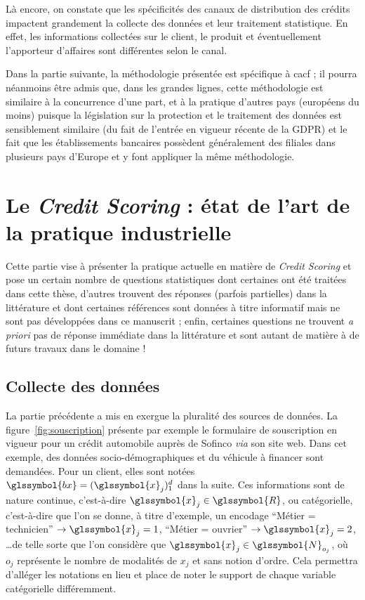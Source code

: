 Là encore, on constate que les spécificités des canaux de distribution des crédits impactent grandement la collecte des données et leur traitement statistique. En effet, les informations collectées sur le client, le produit et éventuellement l'apporteur d'affaires sont différentes selon le canal.

Dans la partie suivante, la méthodologie présentée est spécifique à \gls{cacf} ; il pourra néanmoins être admis que, dans les grandes lignes, cette méthodologie est similaire à la concurrence d'une part, et à la pratique d'autres pays (européens du moins) puisque la législation sur la protection et le traitement des données est sensiblement similaire (du fait de l'entrée en vigueur récente de la GDPR) et le fait que les établissements bancaires possèdent généralement des filiales dans plusieurs pays d'Europe et y font appliquer la même méthodologie.


\section{Le \textit{Credit Scoring} : état de l'art de la pratique industrielle} \label{chap1:sec2}

Cette partie vise à présenter la pratique actuelle en matière de \textit{Credit Scoring} et pose un certain nombre de questions statistiques dont certaines ont été traitées dans cette thèse, d'autres trouvent des réponses (parfois partielles) dans la littérature et dont certaines références sont données à titre informatif mais ne sont pas développées dans ce manuscrit ; enfin, certaines questions ne trouvent \textit{a priori} pas de réponse immédiate dans la littérature et sont autant de matière à de futurs travaux dans le domaine !

\subsection{Collecte des données}

La partie précédente a mis en exergue la pluralité des sources de données. La figure~\ref{fig:souscription} présente par exemple le formulaire de souscription en vigueur pour un crédit automobile auprès de Sofinco \textit{via} son site web. Dans cet exemple, des données socio-démographiques et du véhicule à financer sont demandées. Pour un client, elles sont notées $\glssymbol{bx} = (\glssymbol{x}_j)_1^d$ dans la suite. Ces informations sont de nature continue, c'est-à-dire $\glssymbol{x}_j \in \glssymbol{R}$, ou catégorielle, c'est-à-dire que l'on se donne, à titre d'exemple, un encodage ``Métier = technicien'' $\rightarrow \glssymbol{x}_j = 1$, ``Métier = ouvrier'' $\rightarrow \glssymbol{x}_j = 2$, \dots de telle sorte que l'on considère que $\glssymbol{x}_j \in \glssymbol{N}_{o_j}$, où $o_j$ représente le nombre de modalités de $x_j$ et sans notion d'ordre. Cela permettra d'alléger les notations en lieu et place de noter le support de chaque variable catégorielle différemment.

